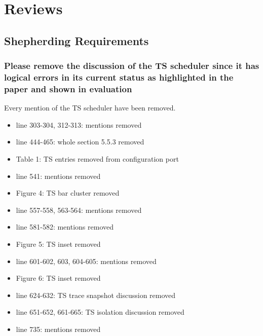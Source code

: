 \newpage
\section{Reviews}

    \subsection{Shepherding Requirements}
        \subsubsection{Please remove the discussion of the TS scheduler since it has logical errors in its current status as highlighted in the paper and shown in evaluation}
            Every mention of the TS scheduler have been removed.
            \begin{itemize}
                \item line 303-304, 312-313: mentions removed
                \item line 444-465: whole section 5.5.3 removed
                \item Table 1: TS entries removed from configuration port
                \item line 541: mentions removed
                \item Figure 4: TS bar cluster removed
                \item line 557-558, 563-564: mentions removed
                \item line 581-582: mentions removed
                \item Figure 5: TS inset removed
                \item line 601-602, 603, 604-605: mentions removed
                \item Figure 6: TS inset removed
                \item line 624-632: TS trace snapshot discussion removed
                \item line 651-652, 661-665: TS isolation discussion removed
                \item line 735: mentions removed
            \end{itemize}

